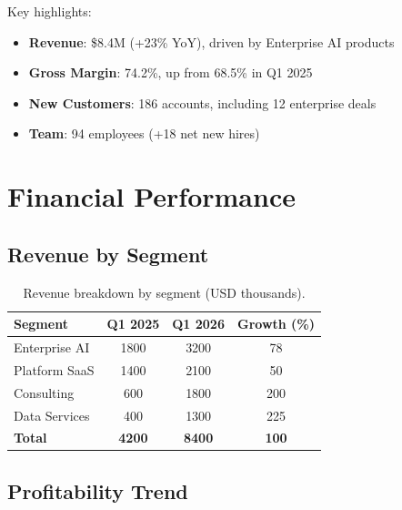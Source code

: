 \documentclass[11pt,a4paper]{article}
\begin{document}
Key highlights:
\begin{itemize}[leftmargin=1.5em]
    \item \textbf{Revenue}: \$8.4M (+23\% YoY), driven by Enterprise AI products
    \item \textbf{Gross Margin}: 74.2\%, up from 68.5\% in Q1 2025
    \item \textbf{New Customers}: 186 accounts, including 12 enterprise deals
    \item \textbf{Team}: 94 employees (+18 net new hires)
\end{itemize}

\section{Financial Performance}

\subsection{Revenue by Segment}

\begin{table}[H]
    \centering
    \caption{Revenue breakdown by segment (USD thousands).}
    \begin{tabular}{l S S S[table-format=2.0] }
        \toprule
        \textbf{Segment} & {\textbf{Q1 2025}} & {\textbf{Q1 2026}} & {\textbf{Growth (\%)}} \\
        \midrule
        Enterprise AI    & 1800 & 3200 & 78 \\
        Platform SaaS    & 1400 & 2100 & 50 \\
        Consulting       & 600  & 1800 & 200 \\
        Data Services    & 400  & 1300 & 225 \\
        \midrule
        \textbf{Total}   & \bfseries 4200 & \bfseries 8400 & \bfseries 100 \\
        \bottomrule
    \end{tabular}
\end{table}

\subsection{Profitability Trend}
\end{document}
